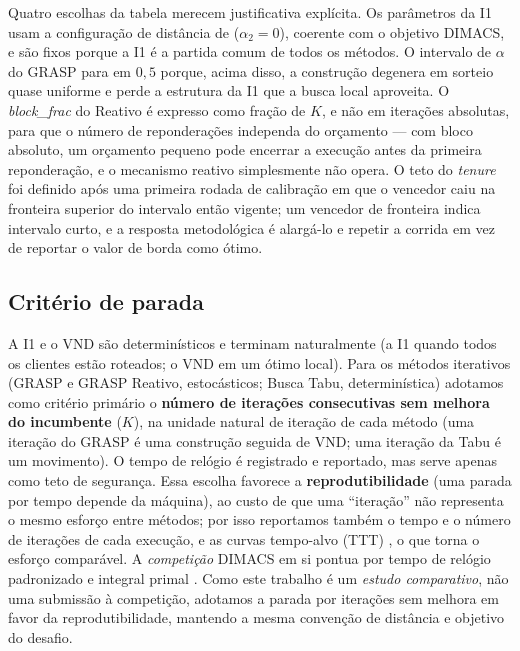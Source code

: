 \documentclass[12pt, a4paper]{article}
\begin{document}
Quatro escolhas da tabela merecem justificativa explícita. Os parâmetros da I1 usam a configuração de distância de \citet{solomon1987algorithms} ($\alpha_2=0$), coerente com o objetivo DIMACS, e são fixos porque a I1 é a partida comum de todos os métodos. O intervalo de $\alpha$ do GRASP para em $0{,}5$ porque, acima disso, a construção degenera em sorteio quase uniforme e perde a estrutura da I1 que a busca local aproveita. O \textit{block\_frac} do Reativo é expresso como fração de $K$, e não em iterações absolutas, para que o número de reponderações independa do orçamento --- com bloco absoluto, um orçamento pequeno pode encerrar a execução antes da primeira reponderação, e o mecanismo reativo simplesmente não opera. O teto do \textit{tenure} foi definido após uma primeira rodada de calibração em que o vencedor caiu na fronteira superior do intervalo então vigente; um vencedor de fronteira indica intervalo curto, e a resposta metodológica é alargá-lo e repetir a corrida em vez de reportar o valor de borda como ótimo.

\subsection{Critério de parada}\label{sec:parada}
A I1 e o VND são determinísticos e terminam naturalmente (a I1 quando todos os clientes estão roteados; o VND em um ótimo local). Para os métodos iterativos (GRASP e GRASP Reativo, estocásticos; Busca Tabu, determinística) adotamos como critério primário o \textbf{número de iterações consecutivas sem melhora do incumbente} ($K$), na unidade natural de iteração de cada método (uma iteração do GRASP é uma construção seguida de VND; uma iteração da Tabu é um movimento). O tempo de relógio é registrado e reportado, mas serve apenas como teto de segurança. Essa escolha favorece a \textbf{reprodutibilidade} (uma parada por tempo depende da máquina), ao custo de que uma ``iteração'' não representa o mesmo esforço entre métodos; por isso reportamos também o tempo e o número de iterações de cada execução, e as curvas tempo-alvo (TTT) \citep{aiex2007ttt}, o que torna o esforço comparável. A \emph{competição} DIMACS em si pontua por tempo de relógio padronizado e integral primal \citep{dimacs12vrptw}. Como este trabalho é um \emph{estudo comparativo}, não uma submissão à competição, adotamos a parada por iterações sem melhora em favor da reprodutibilidade, mantendo a mesma convenção de distância e objetivo do desafio.
\end{document}
